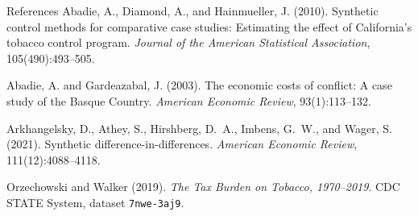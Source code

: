 \documentclass[10pt,aspectratio=169]{beamer}
\begin{document}
\appendix
\begin{frame}{References}
\footnotesize
Abadie, A., Diamond, A., and Hainmueller, J. (2010). Synthetic control methods
for comparative case studies: Estimating the effect of California's tobacco
control program. \emph{Journal of the American Statistical Association},
105(490):493--505.

\medskip
Abadie, A. and Gardeazabal, J. (2003). The economic costs of conflict: A case
study of the Basque Country. \emph{American Economic Review}, 93(1):113--132.

\medskip
Arkhangelsky, D., Athey, S., Hirshberg, D.~A., Imbens, G.~W., and Wager, S.
(2021). Synthetic difference-in-differences. \emph{American Economic Review},
111(12):4088--4118.

\medskip
Orzechowski and Walker (2019). \emph{The Tax Burden on Tobacco, 1970--2019}.
CDC STATE System, dataset \texttt{7nwe-3aj9}.
\end{frame}
\end{document}
